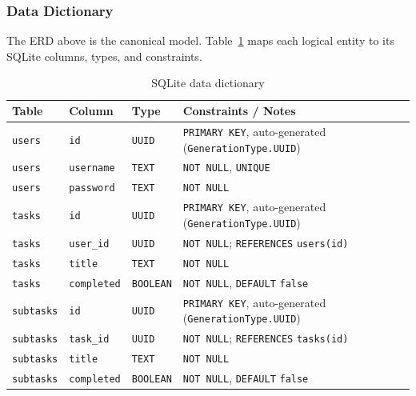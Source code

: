 \newpage

\subsubsection{Data Dictionary}
The ERD above is the canonical model. Table~\ref{tab:data-dictionary} maps each logical
entity to its SQLite columns, types, and constraints.

\begin{table}[htbp]
  \centering
  \caption{SQLite data dictionary}
  \label{tab:data-dictionary}
  \small
  \begin{tabularx}{\textwidth}{@{} l l l X @{}}
    \toprule
    \textbf{Table} & \textbf{Column} & \textbf{Type} & \textbf{Constraints / Notes} \\
    \midrule
    \texttt{users} & \texttt{id}             & \texttt{UUID}    & \texttt{PRIMARY KEY}, auto-generated (\texttt{GenerationType.UUID}) \\
    \texttt{users} & \texttt{username}       & \texttt{TEXT}    & \texttt{NOT NULL}, \texttt{UNIQUE} \\
    \texttt{users} & \texttt{password}       & \texttt{TEXT}    & \texttt{NOT NULL} \\
    \midrule
    \texttt{tasks} & \texttt{id}             & \texttt{UUID}    & \texttt{PRIMARY KEY}, auto-generated (\texttt{GenerationType.UUID}) \\
    \texttt{tasks} & \texttt{user\_id}       & \texttt{UUID}    & \texttt{NOT NULL}; \texttt{REFERENCES} \texttt{users(id)} \\
    \texttt{tasks} & \texttt{title}          & \texttt{TEXT}    & \texttt{NOT NULL} \\
    \texttt{tasks} & \texttt{completed}      & \texttt{BOOLEAN} & \texttt{NOT NULL}, \texttt{DEFAULT} \texttt{false} \\
    \midrule
    \texttt{subtasks} & \texttt{id}          & \texttt{UUID}    & \texttt{PRIMARY KEY}, auto-generated (\texttt{GenerationType.UUID}) \\
    \texttt{subtasks} & \texttt{task\_id}    & \texttt{UUID}    & \texttt{NOT NULL}; \texttt{REFERENCES} \texttt{tasks(id)} \\
    \texttt{subtasks} & \texttt{title}       & \texttt{TEXT}    & \texttt{NOT NULL} \\
    \texttt{subtasks} & \texttt{completed}   & \texttt{BOOLEAN} & \texttt{NOT NULL}, \texttt{DEFAULT} \texttt{false} \\
    \bottomrule
  \end{tabularx}
\end{table}

